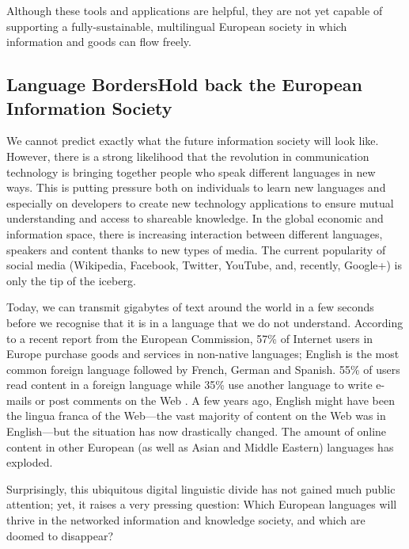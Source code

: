 \begin{multicols}{2}
Although these tools and applications are helpful, they are not yet capable of supporting a fully-sustainable, multilingual European society in which information and goods can flow freely.

\subsection[Language Borders Hold back the European Information Society]{Language Borders\newline Hold back the European Information Society}

We cannot predict exactly what the future information society will look like. However, there is a strong likelihood that the revolution in communication technology is bringing together people who speak different languages in new ways. This is putting pressure both on individuals to learn new languages and especially on developers to create new technology applications to ensure mutual understanding and access to shareable knowledge. In the global economic and information space, there is increasing interaction between different languages, speakers and content thanks to new types of media. The current popularity of social media (Wikipedia, Facebook, Twitter, YouTube, and, recently, Google+) is only the tip of the iceberg.


Today, we can transmit gigabytes of text around the world in a few seconds before we recognise that it is in a language that we do not understand. According to a recent report from the European Commission, 57\% of Internet users in Europe purchase goods and services in non-native languages; English is the most common foreign language followed by French, German and Spanish. 55\% of users read content in a foreign language while 35\% use another language to write e-mails or post comments on the Web \cite{EC1}. A few years ago, English might have been the lingua franca of the Web—the vast majority of content on the Web was in English—but the situation has now drastically changed. The amount of online content in other European (as well as Asian and Middle Eastern) languages has exploded.

Surprisingly, this ubiquitous digital linguistic divide has not gained much public attention; yet, it raises a very pressing question: Which European languages will thrive in the networked information and knowledge society, and which are doomed to disappear?


\end{multicols}
